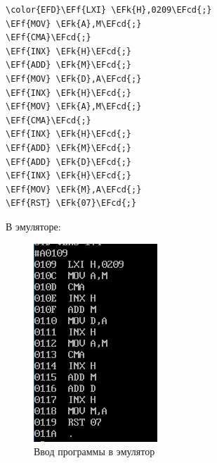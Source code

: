 \documentclass[14pt]{extarticle}
\newcommand{\EFcd}[1]{\textcolor{EFcd}{#1}} %
\newcommand{\EFk}[1]{\textcolor{EFk}{#1}} %
\newcommand{\EFf}[1]{\textcolor{EFf}{#1}} %
\begin{document}
\begin{Code}
\begin{Verbatim}
\color{EFD}\EFf{LXI} \EFk{H},0209\EFcd{;}
\EFf{MOV} \EFk{A},M\EFcd{;}
\EFf{CMA}\EFcd{;}
\EFf{INX} \EFk{H}\EFcd{;}
\EFf{ADD} \EFk{M}\EFcd{;}
\EFf{MOV} \EFk{D},A\EFcd{;}
\EFf{INX} \EFk{H}\EFcd{;}
\EFf{MOV} \EFk{A},M\EFcd{;}
\EFf{CMA}\EFcd{;}
\EFf{INX} \EFk{H}\EFcd{;}
\EFf{ADD} \EFk{M}\EFcd{;}
\EFf{ADD} \EFk{D}\EFcd{;}
\EFf{INX} \EFk{H}\EFcd{;}
\EFf{MOV} \EFk{M},A\EFcd{;}
\EFf{RST} \EFk{07}\EFcd{;}
\end{Verbatim}
\end{Code}


В эмуляторе:

\begin{figure}[H]
\centering
\includegraphics[width=.9\linewidth]{images/2023-04-11_12-30-04_screenshot.png}
\caption{Ввод программы в эмулятор}
\end{figure}
\end{document}
